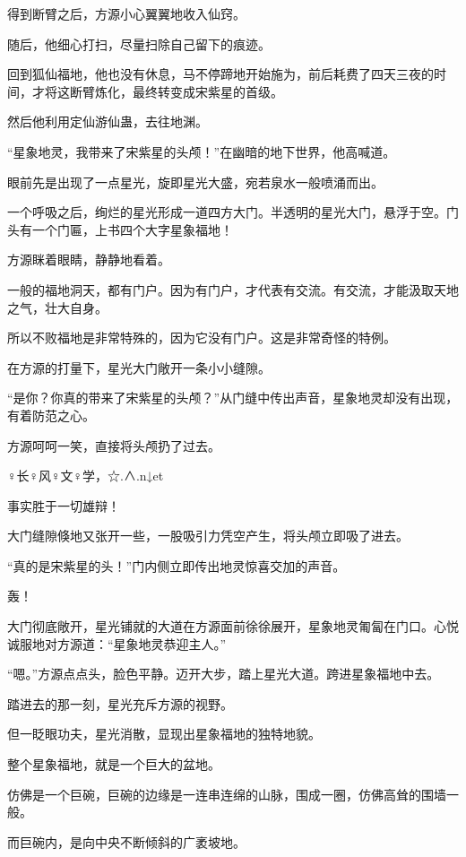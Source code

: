 
\begin{this_body}

得到断臂之后，方源小心翼翼地收入仙窍。

随后，他细心打扫，尽量扫除自己留下的痕迹。

回到狐仙福地，他也没有休息，马不停蹄地开始施为，前后耗费了四天三夜的时间，才将这断臂炼化，最终转变成宋紫星的首级。

然后他利用定仙游仙蛊，去往地渊。

“星象地灵，我带来了宋紫星的头颅！”在幽暗的地下世界，他高喊道。

眼前先是出现了一点星光，旋即星光大盛，宛若泉水一般喷涌而出。

一个呼吸之后，绚烂的星光形成一道四方大门。半透明的星光大门，悬浮于空。门头有一个门匾，上书四个大字星象福地！

方源眯着眼睛，静静地看着。

一般的福地洞天，都有门户。因为有门户，才代表有交流。有交流，才能汲取天地之气，壮大自身。

所以不败福地是非常特殊的，因为它没有门户。这是非常奇怪的特例。

在方源的打量下，星光大门敞开一条小小缝隙。

“是你？你真的带来了宋紫星的头颅？”从门缝中传出声音，星象地灵却没有出现，有着防范之心。

方源呵呵一笑，直接将头颅扔了过去。

♀长♀风♀文♀学，☆.∧.n↓et

事实胜于一切雄辩！

大门缝隙倏地又张开一些，一股吸引力凭空产生，将头颅立即吸了进去。

“真的是宋紫星的头！”门内侧立即传出地灵惊喜交加的声音。

轰！

大门彻底敞开，星光铺就的大道在方源面前徐徐展开，星象地灵匍匐在门口。心悦诚服地对方源道：“星象地灵恭迎主人。”

“嗯。”方源点点头，脸色平静。迈开大步，踏上星光大道。跨进星象福地中去。

踏进去的那一刻，星光充斥方源的视野。

但一眨眼功夫，星光消散，显现出星象福地的独特地貌。

整个星象福地，就是一个巨大的盆地。

仿佛是一个巨碗，巨碗的边缘是一连串连绵的山脉，围成一圈，仿佛高耸的围墙一般。

而巨碗内，是向中央不断倾斜的广袤坡地。


\end{this_body}

